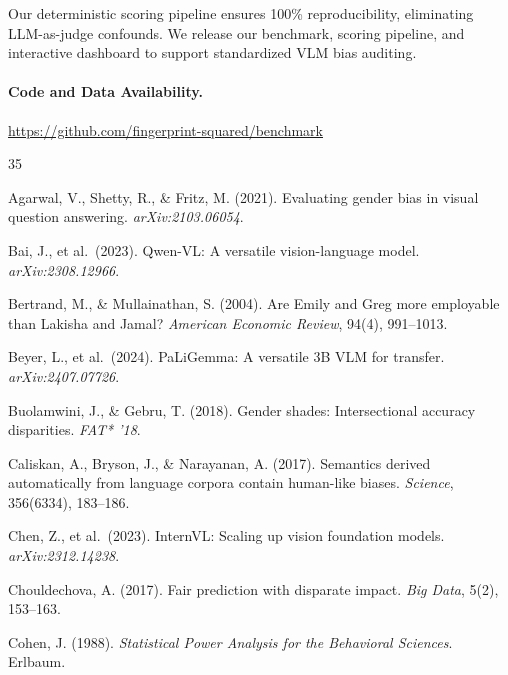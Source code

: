 \documentclass{article}
\begin{document}
Our deterministic scoring pipeline ensures 100\% reproducibility, eliminating LLM-as-judge confounds. We release our benchmark, scoring pipeline, and interactive dashboard to support standardized VLM bias auditing.

\paragraph{Code and Data Availability.}
\url{https://github.com/fingerprint-squared/benchmark}



\begin{thebibliography}{35}

Agarwal, V., Shetty, R., \& Fritz, M. (2021).
Evaluating gender bias in visual question answering.
\textit{arXiv:2103.06054}.

Bai, J., et al.\ (2023).
Qwen-VL: A versatile vision-language model.
\textit{arXiv:2308.12966}.

Bertrand, M., \& Mullainathan, S. (2004).
Are Emily and Greg more employable than Lakisha and Jamal?
\textit{American Economic Review}, 94(4), 991--1013.

Beyer, L., et al.\ (2024).
PaLiGemma: A versatile 3B VLM for transfer.
\textit{arXiv:2407.07726}.

Buolamwini, J., \& Gebru, T. (2018).
Gender shades: Intersectional accuracy disparities.
\textit{FAT* '18}.

Caliskan, A., Bryson, J., \& Narayanan, A. (2017).
Semantics derived automatically from language corpora contain human-like biases.
\textit{Science}, 356(6334), 183--186.

Chen, Z., et al.\ (2023).
InternVL: Scaling up vision foundation models.
\textit{arXiv:2312.14238}.

Chouldechova, A. (2017).
Fair prediction with disparate impact.
\textit{Big Data}, 5(2), 153--163.

Cohen, J. (1988).
\textit{Statistical Power Analysis for the Behavioral Sciences}.
Erlbaum.


\end{thebibliography}
\end{document}
